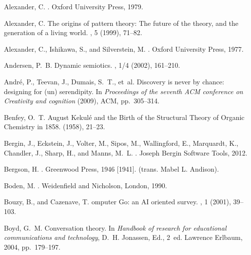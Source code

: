 \documentclass{llncs}
\begin{document}
% 
% 

\begin{thebibliography}{10}

{\sc Alexander, C.}
.
\newblock Oxford University Press, 1979.

{\sc Alexander, C.}
\newblock The origins of pattern theory: {T}he future of the theory, and the
  generation of a living world.
, 5 (1999), 71--82.

{\sc Alexander, C., Ishikawa, S., and Silverstein, M.}
.
\newblock Oxford University Press, 1977.

{\sc Andersen, P.~B.}
\newblock Dynamic semiotics.
, 1/4 (2002), 161--210.

{\sc Andr{\'e}, P., Teevan, J., Dumais, S.~T., et~al.}
\newblock Discovery is never by chance: designing for (un) serendipity.
\newblock In {\em Proceedings of the seventh ACM conference on Creativity and
  cognition\/} (2009), ACM, pp.~305--314.

{\sc Benfey, O.~T.}
\newblock August {K}ekul\'e and the {B}irth of the {S}tructural {T}heory of
  {O}rganic {C}hemistry in 1858.
 (1958), 21--23.

{\sc Bergin, J., Eckstein, J., Volter, M., Sipos, M., Wallingford, E.,
  Marquardt, K., Chandler, J., Sharp, H., and Manns, M.~L.}
.
\newblock Joseph Bergin Software Tools, 2012.

{\sc Bergson, H.}
.
\newblock Greenwood Press, 1946 [1941].
\newblock (trans. Mabel L. Andison).

{\sc Boden, M.}
.
\newblock Weidenfield and Nicholson, London, 1990.

{\sc Bouzy, B., and Cazenave, T.}
omputer {G}o: an {AI} oriented survey.
, 1 (2001), 39--103.

{\sc Boyd, G.~M.}
\newblock Conversation theory.
\newblock In {\em Handbook of research for educational communications and
  technology}, D.~H. Jonassen, Ed., 2~ed. Lawrence Erlbaum, 2004, pp.~179--197.


\end{thebibliography}
\end{document}
